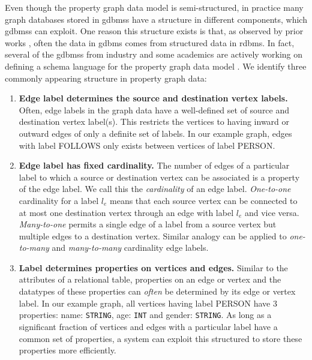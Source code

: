 \begin{guideline}
	\label{gdln:graph-schema}
	Even though the property graph data model is semi-structured, in practice many graph databases stored in \gls{gdbms}s have a structure in different components, which \gls{gdbms}s can exploit. One reason this structure exists is that, as observed by prior works \cite{survey}, often the data in \gls{gdbms} comes from structured data in \gls{rdbms}. In fact, several of the \gls{gdbms}s from industry and some academics are actively working on defining a schema language for the property graph data model \cite{schema-validation-bonifati, defining-schema-hartig}. We identify three commonly appearing structure in property graph data:
	
	\begin{enumerate}
		
		\item \textbf{Edge label determines the source and destination vertex labels.} Often, edge labels in the graph data have a well-defined set of source and destination vertex label(s). This restricts the vertices to having inward or outward edges of only a definite set of labels. In our example graph, edges with label FOLLOWS only exists between vertices of label PERSON.
		
		\item \textbf{Edge label has fixed cardinality.} The number of edges of a particular label to which a source or destination vertex can be associated is a property of the edge label. We call this the \emph{cardinality} of an edge label. \emph{One-to-one} cardinality for a label $l_e$ means that each source vertex can be connected to at most one destination vertex through an edge with label $l_e$ and vice versa. \emph{Many-to-one} permits a single edge of a label from a source vertex but multiple edges to a destination vertex. Similar analogy can be applied to \emph{one-to-many} and \emph{many-to-many} cardinality edge labels.
		
		\item \textbf{Label determines properties on vertices and edges.} Similar to the attributes of a relational table, properties on an edge or vertex and the datatypes of these properties can \emph{often} be determined by its edge or vertex label. In our example graph, all vertices having label PERSON have 3 properties: name: \texttt{STRING}, age: \texttt{INT} and gender: \texttt{STRING}. As long as a significant fraction of vertices and edges with a particular label have a common set of properties, a system can exploit this structured to store these properties more efficiently. 
		

\end{enumerate}
\end{guideline}
